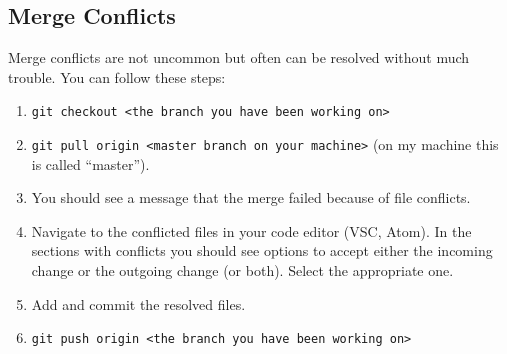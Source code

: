 \subsection{Merge Conflicts}

Merge conflicts are not uncommon but often can be resolved without much trouble. You can follow these steps:
\begin{enumerate}
	\item \texttt{git checkout <the branch you have been working on>}
	\item \texttt{git pull origin <master branch on your machine>} (on my machine this is called ``master'').
	\item You should see a message that the merge failed because of file conflicts.
	\item Navigate to the conflicted files in your code editor (VSC, Atom). In the sections with conflicts you should see options to accept either the incoming change or the outgoing change (or both). Select the appropriate one.
	\item Add and commit the resolved files.
	\item \texttt{git push origin <the branch you have been working on>}
\end{enumerate}
